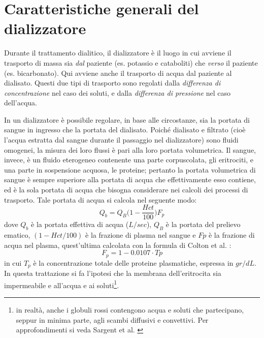 \section{Caratteristiche generali del dializzatore}

Durante il trattamento dialitico, il dializzatore è il luogo in cui avviene il trasporto di massa sia \textit{dal} paziente (es. potassio e cataboliti) che \textit{verso} il paziente (es. bicarbonato). Qui avviene anche il trasporto di acqua dal paziente al dialisato. Questi due tipi di trasporto sono regolati dalla \textit{differenza di concentrazione} nel caso dei soluti, e dalla \textit{differenza di pressione} nel caso dell'acqua.

In un dializzatore è possibile regolare, in base alle circostanze, sia la portata di sangue in ingresso che la portata del dialisato.
Poiché dialisato e filtrato (cioè l'acqua estratta dal sangue durante il passaggio nel dializzatore) sono fluidi omogenei, la misura dei loro flussi è pari alla loro portata volumetrica. Il sangue, invece, è un fluido eterogeneo contenente una parte corpuscolata, gli eritrociti, e una parte in sospensione acquosa, le proteine; pertanto la portata volumetrica di sangue è sempre superiore alla portata di acqua che effettivamente esso contiene, ed è la sola portata di acqua che bisogna considerare nei calcoli dei processi di trasporto. Tale portata di acqua si calcola nel seguente modo: 
\begin{equation}
	Q_b = Q_B\biggl(1-\frac{Hct}{100}\biggr)F_p \label{Qeff}
\end{equation}
dove $Q_b$ è la portata effettiva di acqua ($L/sec$), $Q_B$ è la portata del prelievo ematico, $(1-Hct/100)$ è la frazione di plasma nel sangue e $Fp$ è la frazione di acqua nel plasma, quest'ultima calcolata con la formula di Colton et al. \cite{colton}:
\begin{equation}
	F_p = 1-0.0107\cdot Tp
	\label{eq:colton}
\end{equation}
in cui $T_p$ è la concentrazione totale delle proteine plasmatiche, espressa in $gr/dL$.\\
In questa trattazione si fa l'ipotesi che la membrana dell'eritrocita sia impermeabile e all'acqua e ai soluti\footnote{in realtà, anche i globuli rossi contengono acqua e soluti che partecipano, seppur in minima parte, agli scambi diffusivi e convettivi. Per approfondimenti si veda Sargent et al. \cite{sargent}}.

